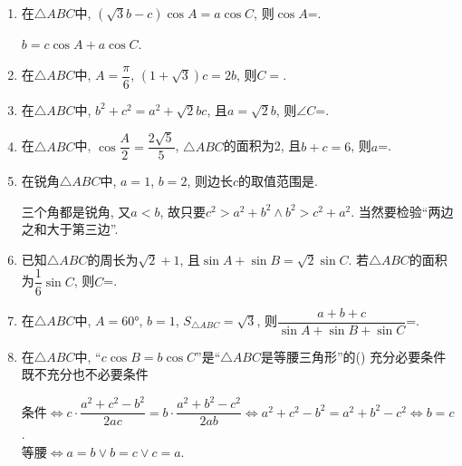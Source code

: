 \begin{enumerate}
\item 在$\triangle{ABC}$中, $(\sqrt{3}b-c)\cos{A}=a\cos{C}$, 则$\cos{A}$=. 
\begin{jieda}
$b=c\cos{A}+a\cos{C}$. 
\end{jieda}

\item 在$\triangle{ABC}$中, $A=\dfrac{\pi}{6}$, $(1+\sqrt{3})c=2b$, 则$C=$. 

\item 在$\triangle{ABC}$中, $b^2+c^2=a^2+\sqrt{2}bc$, 且$a=\sqrt{2}b$, 则$\angle{C}$=. 

\item 在$\triangle{ABC}$中, $\cos\dfrac{A}{2}=\dfrac{2\sqrt{5}}{5}$, $\triangle{ABC}$的面积为2, 且$b+c=6$, 则$a$=. 

\item 在锐角$\triangle{ABC}$中, $a=1$, $b=2$, 则边长$c$的取值范围是. 
\begin{jieda}
三个角都是锐角, 又$a<b$, 故只要$c^2>a^2+b^2\land b^2>c^2+a^2$. 当然要检验``两边之和大于第三边''. 
\end{jieda}

\item 已知$\triangle{ABC}$的周长为$\sqrt{2}+1$, 且$\sin{A}+\sin{B}=\sqrt{2}\sin{C}$. 若$\triangle{ABC}$的面积为$\dfrac{1}{6}\sin{C}$, 则$C$=. 
\begin{jieda}

\end{jieda}

\item 在$\triangle{ABC}$中, $A=\ang{60}$, $b=1$, $S_{\triangle{ABC}}=\sqrt{3}$, 则$\dfrac{a+b+c}{\sin{A}+\sin{B}+\sin{C}}$=. 
\begin{jieda}

\end{jieda}

\item 在$\triangle{ABC}$中, ``$c\cos{B}=b\cos{C}$''是``$\triangle{ABC}$是等腰三角形''的\dotfill()
{充分必要条件}{既不充分也不必要条件}
\begin{jieda}
条件$\iff c\cdot\dfrac{a^2+c^2-b^2}{2ac}=b\cdot\dfrac{a^2+b^2-c^2}{2ab}\iff a^2+c^2-b^2=a^2+b^2-c^2\iff b=c$. \\
等腰$\iff a=b\lor b=c\lor c=a$. 
\end{jieda}


\end{enumerate}
